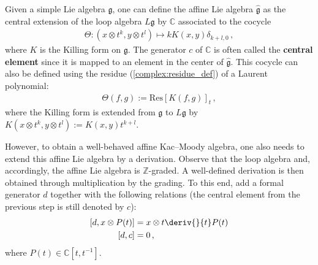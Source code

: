     \begin{definition}
        Given a simple Lie algebra $\mathfrak{g}$, one can define the affine Lie algebra $\widehat{\mathfrak{g}}$ as the central extension of the loop algebra $L\mathfrak{g}$ by $\mathbb{C}$ associated to the cocycle
        \begin{gather}
            \Theta:(x\otimes t^k,y\otimes t^l)\mapsto kK(x,y)\delta_{k+l,0}\,,
        \end{gather}
        where $K$ is the Killing form on $\mathfrak{g}$. The generator $c$ of $\mathbb{C}$ is often called the \textbf{central element} since it is mapped to an element in the center of $\widehat{\mathfrak{g}}$. This cocycle can also be defined using the residue (\cref{complex:residue_def}) of a Laurent polynomial:
        \begin{gather}
            \Theta(f,g) := \mathrm{Res}\left[K(f,g)\right]_t\,,
        \end{gather}
        where the Killing form is extended from $\mathfrak{g}$ to $L\mathfrak{g}$ by $K(x\otimes t^k,y\otimes t^l):=K(x,y)t^{k+l}$.

        However, to obtain a well-behaved affine Kac--Moody algebra, one also needs to extend this affine Lie algebra by a derivation. Observe that the loop algebra and, accordingly, the affine Lie algebra is $\mathbb{Z}$-graded. A well-defined derivation is then obtained through multiplication by the grading. To this end, add a formal generator $d$ together with the following relations (the central element from the previous step is still denoted by $c$):
        \begin{gather}
            \begin{aligned}
                [d,x\otimes P(t)] &= x\otimes t\deriv{}{t}P(t)\\
                [d,c] &= 0\,,
            \end{aligned}
        \end{gather}
        where $P(t)\in\mathbb{C}[t,t^{-1}]$.
    \end{definition}


